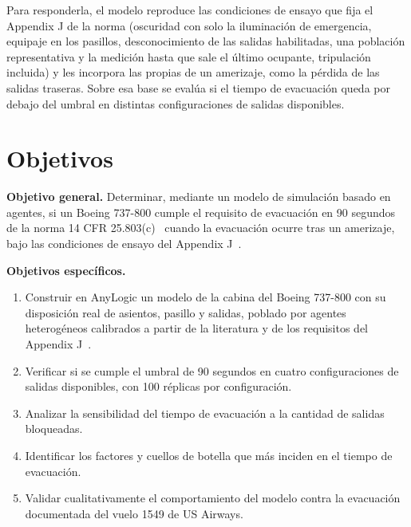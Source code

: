 \documentclass[a4paper, 11pt]{article}
\begin{document}
Para responderla, el modelo reproduce las condiciones de ensayo que fija el
Appendix J de la norma (oscuridad con solo la iluminaci\'on de emergencia, equipaje
en los pasillos, desconocimiento de las salidas habilitadas, una poblaci\'on
representativa y la medici\'on hasta que sale el \'ultimo ocupante, tripulaci\'on
incluida) y les incorpora las propias de un amerizaje, como la p\'erdida de las
salidas traseras. Sobre esa base se eval\'ua si el tiempo de evacuaci\'on queda por
debajo del umbral en distintas configuraciones de salidas disponibles.

\newpage
\section{Objetivos}\label{sec:objetivos}

\textbf{Objetivo general.} Determinar, mediante un modelo de simulaci\'on basado en
agentes, si un Boeing 737-800 cumple el requisito de evacuaci\'on en 90 segundos de
la norma 14 CFR 25.803(c)~\cite{cfr25803} cuando la evacuaci\'on ocurre tras un
amerizaje, bajo las condiciones de ensayo del Appendix J~\cite{cfrAppJ}.

\textbf{Objetivos espec\'ificos.}
\begin{enumerate}[leftmargin=2em]
    \item Construir en AnyLogic un modelo de la cabina del Boeing 737-800 con su
          disposici\'on real de asientos, pasillo y salidas, poblado por agentes
          heterog\'eneos calibrados a partir de la literatura y de los requisitos del
          Appendix J~\cite{cfrAppJ}.
    \item Verificar si se cumple el umbral de 90 segundos en cuatro configuraciones
          de salidas disponibles, con 100 r\'eplicas por configuraci\'on.
    \item Analizar la sensibilidad del tiempo de evacuaci\'on a la cantidad de
          salidas bloqueadas.
    \item Identificar los factores y cuellos de botella que m\'as inciden en el
          tiempo de evacuaci\'on.
    \item Validar cualitativamente el comportamiento del modelo contra la
          evacuaci\'on documentada del vuelo 1549 de US Airways.
\end{enumerate}

\newpage
\end{document}
